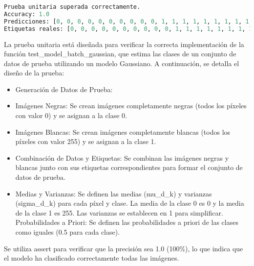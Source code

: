\documentclass[spanish]{article}
\begin{document}
\begin{lstlisting}[language=Python, caption=Salida Prueba Modelo]
Prueba unitaria superada correctamente.
Accuracy: 1.0
Predicciones: [0, 0, 0, 0, 0, 0, 0, 0, 0, 0, 1, 1, 1, 1, 1, 1, 1, 1, 1, 1]
Etiquetas reales: [0, 0, 0, 0, 0, 0, 0, 0, 0, 0, 1, 1, 1, 1, 1, 1, 1, 1, 1, 1]
\end{lstlisting}

La prueba unitaria está diseñada para verificar la correcta implementación de la función test\_model\_batch\_gaussian, que estima las clases de un conjunto de datos de prueba utilizando un modelo Gaussiano. A continuación, se detalla el diseño de la prueba:


\begin{itemize}
    \item Generación de Datos de Prueba:
\item Imágenes Negras: Se crean imágenes completamente negras (todos los píxeles con valor 0) y se asignan a la clase 0.
\item Imágenes Blancas: Se crean imágenes completamente blancas (todos los píxeles con valor 255) y se asignan a la clase 1.
\item Combinación de Datos y Etiquetas: Se combinan las imágenes negras y blancas junto con sus etiquetas correspondientes para formar el conjunto de datos de prueba.
\item Medias y Varianzas: Se definen las medias (mu\_d\_k) y varianzas (sigma\_d\_k) para cada píxel y clase. La media de la clase 0 es 0 y la media de la clase 1 es 255. Las varianzas se establecen en 1 para simplificar.
Probabilidades a Priori: Se definen las probabilidades a priori de las clases como iguales (0.5 para cada clase).
\end{itemize}
Se utiliza assert para verificar que la precisión sea 1.0 (100\%), lo que indica que el modelo ha clasificado correctamente todas las imágenes.

\newpage
\end{document}
